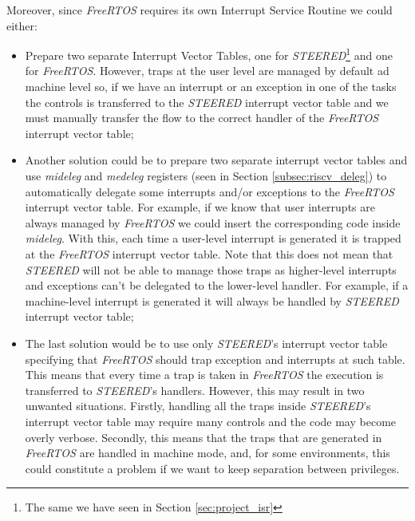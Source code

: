 Moreover, since \textit{FreeRTOS} requires its own Interrupt Service Routine we
could either:
\begin{itemize}
  \item Prepare two separate Interrupt Vector Tables, one for \textit{STEERED}\footnote{The
    same we have seen in Section \ref{sec:project_isr}} and one for \textit{FreeRTOS}.
    However, traps at the user level are managed by default ad machine level so,
    if we have an interrupt or an exception in one of the tasks the controls is
    transferred to the \textit{STEERED} interrupt vector table and we must manually
    transfer the flow to the correct handler of the \textit{FreeRTOS} interrupt
    vector table;

  \item Another solution could be to prepare two separate interrupt vector tables
    and use \textit{mideleg} and \textit{medeleg} registers (seen in Section
    \ref{subsec:riscv_deleg}) to automatically delegate some interrupts and/or exceptions
    to the \textit{FreeRTOS} interrupt vector table. For example, if we know
    that user interrupts are always managed by \textit{FreeRTOS} we could insert
    the corresponding code inside \textit{mideleg}. With this, each time a user-level
    interrupt is generated it is trapped at the \textit{FreeRTOS} interrupt vector
    table. Note that this does not mean that \textit{STEERED} will not be able to
    manage those traps as higher-level interrupts and exceptions can't be delegated
    to the lower-level handler. For example, if a machine-level interrupt is generated
    it will always be handled by \textit{STEERED} interrupt vector table;

  \item The last solution would be to use only \textit{STEERED}'s interrupt
    vector table specifying that \textit{FreeRTOS} should trap exception and interrupts
    at such table. This means that every time a trap is taken in \textit{FreeRTOS}
    the execution is transferred to \textit{STEERED}'s handlers. However, this
    may result in two unwanted situations. Firstly, handling all the traps
    inside \textit{STEERED}'s interrupt vector table may require many controls and
    the code may become overly verbose. Secondly, this means that the traps that
    are generated in \textit{FreeRTOS} are handled in machine mode, and, for
    some environments, this could constitute a problem if we want to keep separation
    between privileges.
\end{itemize}

